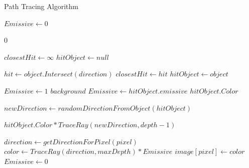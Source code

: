 \documentclass[12pt]{article}
\begin{document}
\begin{algorithm}[H]
    \caption{Path Tracing Algorithm}
    \label{alg:TraceRay}
    \small
    \begin{algorithmic}[1]
        \State $Emissive \gets 0$

        \State \Return $0$ 
        \EndIf

        \State $closestHit \gets \infty$
        \State $hitObject \gets null$

        \State $hit \gets object.Intersect(direction)$
        \State $closestHit \gets hit$
        \State $hitObject \gets object$
        \EndIf
        \EndFor

        \State $Emissive \gets 1$ 
        \State \Return $background$
        \EndIf
        \State $Emissive \gets hitObject.emissive$
         
        \State \Return $hitObject.Color$
        \EndIf

        \State $newDirection \gets randomDirectionFromObject(hitObject)$ 

        \State \Return $hitObject.Color * TraceRay(newDirection, depth - 1)$

        \EndProcedure

        \State $direction \gets getDirectionForPixel(pixel)$
        \State $color \gets TraceRay(direction, maxDepth) * Emissive$
        \State $image[pixel] \gets color$
        \State $Emissive \gets 0$ 
        \EndFor
    \end{algorithmic}
\end{algorithm}
\end{document}
